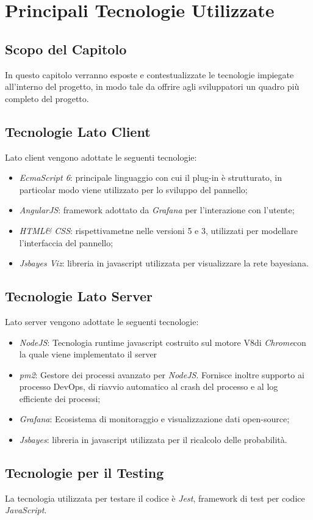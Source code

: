\section{Principali Tecnologie Utilizzate}\label{tecnologie}
\subsection{Scopo del Capitolo}
In questo capitolo verranno esposte e contestualizzate le tecnologie impiegate all'interno del progetto, in modo tale da offrire agli sviluppatori un quadro più completo del progetto.

\subsection{Tecnologie Lato Client}\label{clientTec}
Lato client vengono adottate le seguenti tecnologie:
\begin{itemize}
	\item \textit{EcmaScript 6}\glossario: principale linguaggio con cui il plug-in è strutturato, in particolar modo viene utilizzato per lo sviluppo del pannello;
	\item \textit{AngularJS}: framework adottato da \textit{Grafana} per l'interazione con l'utente;
	\item \textit{HTML\glossario \& CSS\glossario}: rispettivametne nelle versioni 5 e 3, utilizzati per modellare l'interfaccia del pannello;
	\item \textit{Jsbayes Viz}\glossario: libreria in javascript utilizzata per visualizzare la rete bayesiana.
\end{itemize}

\subsection{Tecnologie Lato Server}\label{serverTec}
Lato server vengono adottate le seguenti tecnologie:
\begin{itemize}
	\item \textit{NodeJS}\glossario: Tecnologia runtime javascript costruito sul motore V8\glossario di \textit{Chrome}\glossario con la quale viene implementato il server 
	\item \textit{pm2}: Gestore dei processi avanzato per \textit{NodeJS}. Fornisce inoltre supporto ai processo DevOps\glossario , di riavvio automatico al crash del processo e al log efficiente dei processi;
	\item \textit{Grafana}: Ecosistema di monitoraggio e visualizzazione dati open-source;
	\item \textit{Jsbayes}\glossario: libreria in javascript utilizzata per il ricalcolo delle probabilità.
\end{itemize}

\subsection{Tecnologie per il Testing}\label{testTec}
La tecnologia utilizzata per testare il codice è \textit{Jest}\glossario, framework di test per codice \textit{JavaScript}.